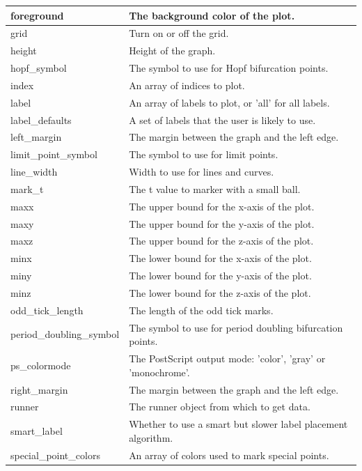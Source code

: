 \documentclass[12pt]{report}
\begin{document}
\begin{longtable}{| l | l |}
 \hline
 foreground  &  The background color of the plot. \\
 \hline
 grid  &  Turn on or off the grid. \\
 \hline
 height  & Height of the graph. \\
 \hline
 hopf\_symbol  &    The symbol to use for Hopf bifurcation points. \\ 
 \hline
 index  & An array of indices to plot.\\
 \hline
 label  & An array of labels to plot, or 'all' for all labels.\\
 \hline
 label\_defaults  & A set of labels that the user is likely to use. \\
 \hline
 left\_margin  & The margin between the graph and the left edge. \\
 \hline
 limit\_point\_symbol  &    The symbol to use for limit points. \\ 
 \hline
 line\_width & Width to use for lines and curves. \\
 \hline
 mark\_t  &  The t value to marker with a small ball. \\      
 \hline
 maxx  & The upper bound for the x-axis of the plot. \\
 \hline
 maxy  & The upper bound for the y-axis of the plot. \\
 \hline
 maxz  & The upper bound for the z-axis of the plot. \\
 \hline
 minx  &  The lower bound for the x-axis of the plot. \\
 \hline
 miny  & The lower bound for the y-axis of the plot. \\
 \hline
 minz  & The lower bound for the z-axis of the plot. \\
 \hline
 odd\_tick\_length  & The length of the odd tick marks. \\
 \hline
 period\_doubling\_symbol  &   The symbol to use for period doubling bifurcation points. \\ 
 \hline
 ps\_colormode  & The PostScript output mode: 'color', 'gray' or 'monochrome'. \\ 
 \hline
 right\_margin  & The margin between the graph and the left edge. \\
 \hline
 runner  &  The runner object from which to get data. \\       
 \hline
 smart\_label  & Whether to use a smart but slower label placement algorithm. \\ 
 \hline
 special\_point\_colors  &    An array of colors used to mark special points. \\ 

\end{longtable}
\end{document}
